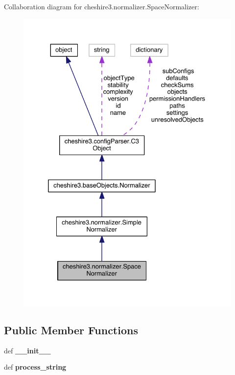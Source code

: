 Collaboration diagram for cheshire3.\-normalizer.\-Space\-Normalizer\-:
\nopagebreak
\begin{figure}[H]
\begin{center}
\leavevmode
\includegraphics[width=328pt]{classcheshire3_1_1normalizer_1_1_space_normalizer__coll__graph}
\end{center}
\end{figure}
\subsection*{Public Member Functions}
\begin{DoxyCompactItemize}
\item 
\hypertarget{classcheshire3_1_1normalizer_1_1_space_normalizer_a5f60513babff07209eceb6b58a8482fe}{def {\bfseries \-\_\-\-\_\-init\-\_\-\-\_\-}}\label{classcheshire3_1_1normalizer_1_1_space_normalizer_a5f60513babff07209eceb6b58a8482fe}

\item 
\hypertarget{classcheshire3_1_1normalizer_1_1_space_normalizer_af63b79b07320d66a737077722251623c}{def {\bfseries process\-\_\-string}}\label{classcheshire3_1_1normalizer_1_1_space_normalizer_af63b79b07320d66a737077722251623c}

\end{DoxyCompactItemize}
